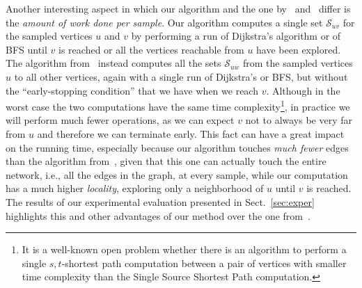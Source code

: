 Another interesting aspect in which our algorithm and the one
by~\citet{JacobKLPT05} and~\citet{BrandesP07} differ is the \emph{amount of work done
per sample}. Our algorithm computes a single set $\mathcal{S}_{uv}$ for the
sampled vertices $u$ and $v$ by performing a run of Dijkstra's algorithm or of
BFS until $v$ is reached or all the vertices reachable from $u$ have been
explored. The algorithm from~\citep{JacobKLPT05,BrandesP07} instead computes
all the sets $\mathcal{S}_{uw}$ from the sampled vertices $u$ to all other
vertices, again with a single run of Dijkstra's or BFS, but without the
``early-stopping condition'' that we have when we reach $v$. Although in the
worst case the two computations have the same time complexity\footnote{It is a
well-known open problem whether there is an algorithm to perform a single
$s,t$-shortest path computation between a pair of vertices with smaller time
complexity than the Single Source Shortest Path computation.}, in practice we
will perform much fewer operations, as we can expect $v$ not to always be very
far from $u$ and therefore we can terminate early. This fact can have a great
impact on the running time, especially because our algorithm touches
\emph{much fewer} edges than the algorithm from~\citep{JacobKLPT05,BrandesP07},
given that this one can actually touch the entire network, i.e., all the edges
in the graph, at every sample, while our computation has a much higher
\emph{locality}, exploring only a neighborhood of $u$ until $v$ is reached. The
results of our experimental evaluation presented in Sect.~\ref{sec:exper}
highlights this and other advantages of our method over the one
from~\citep{JacobKLPT05,BrandesP07}.

